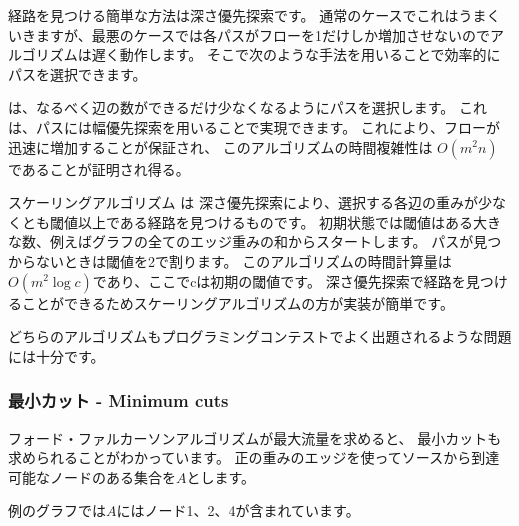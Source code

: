 経路を見つける簡単な方法は深さ優先探索です。
通常のケースでこれはうまくいきますが、最悪のケースでは各パスがフローを1だけしか増加させないのでアルゴリズムは遅く動作します。
そこで次のような手法を用いることで効率的にパスを選択できます。


 \cite{edm72}
は、なるべく辺の数ができるだけ少なくなるようにパスを選択します。
これは、パスには幅優先探索を用いることで実現できます。
これにより、フローが迅速に増加することが保証され、
このアルゴリズムの時間複雑性は $O(m^2 n)$であることが証明され得る。


スケーリングアルゴリズム\cite{ahu91} は
深さ優先探索により、選択する各辺の重みが少なくとも閾値以上である経路を見つけるものです。
初期状態では閾値はある大きな数、例えばグラフの全てのエッジ重みの和からスタートします。
パスが見つからないときは閾値を2で割ります。
このアルゴリズムの時間計算量は$O(m^2 \log c)$であり、ここでcは初期の閾値です。
深さ優先探索で経路を見つけることができるためスケーリングアルゴリズムの方が実装が簡単です。

どちらのアルゴリズムもプログラミングコンテストでよく出題されるような問題には十分です。

\subsubsection{最小カット - Minimum cuts}


フォード・ファルカーソンアルゴリズムが最大流量を求めると、
最小カットも求められることがわかっています。
正の重みのエッジを使ってソースから到達可能なノードのある集合を$A$とします。

例のグラフでは$A$にはノード1、2、4が含まれています。

